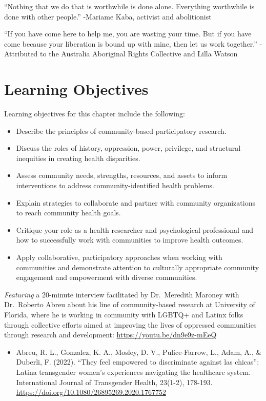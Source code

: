 \documentclass[
  11pt,
]{book}
\providecommand{\tightlist}{%
  \setlength{\itemsep}{0pt}\setlength{\parskip}{0pt}}
\begin{document}
``Nothing that we do that is worthwhile is done alone. Everything worthwhile is done with other people.'' -Mariame Kaba, activist and abolitionist

``If you have come here to help me, you are wasting your time. But if you have come because your liberation is bound up with mine, then let us work together.'' -Attributed to the Australia Aboriginal Rights Collective and Lilla Watson

\hypertarget{learning-objectives-1}{%
\section{Learning Objectives}\label{learning-objectives-1}}

Learning objectives for this chapter include the following:

\begin{itemize}
\tightlist
\item
  Describe the principles of community-based participatory research.
\item
  Discuss the roles of history, oppression, power, privilege, and structural inequities in creating health disparities.
\item
  Assess community needs, strengths, resources, and assets to inform interventions to address community-identified health problems.
\item
  Explain strategies to collaborate and partner with community organizations to reach community health goals.
\item
  Critique your role as a health researcher and psychological professional and how to successfully work with communities to improve health outcomes.
\item
  Apply collaborative, participatory approaches when working with communities and demonstrate attention to culturally appropriate community engagement and empowerment with diverse communities.
\end{itemize}

\emph{Featuring} a 20-minute interview facilitated by Dr.~Meredith Maroney with Dr.~Roberto Abreu about his line of community-based research at University of Florida, where he is working in community with LGBTQ+ and Latinx folks through collective efforts aimed at improving the lives of oppressed communities through research and development: \url{https://youtu.be/dn9e9z-mEeQ}

\begin{itemize}
\tightlist
\item
  Abreu, R. L., Gonzalez, K. A., Mosley, D. V., Pulice-Farrow, L., Adam, A., \& Duberli, F. (2022). ``They feel empowered to discriminate against las chicas'': Latina transgender women's experiences navigating the healthcare system. International Journal of Transgender Health, 23(1-2), 178-193. \url{https://doi.org/10.1080/26895269.2020.1767752}
\end{itemize}
\end{document}
